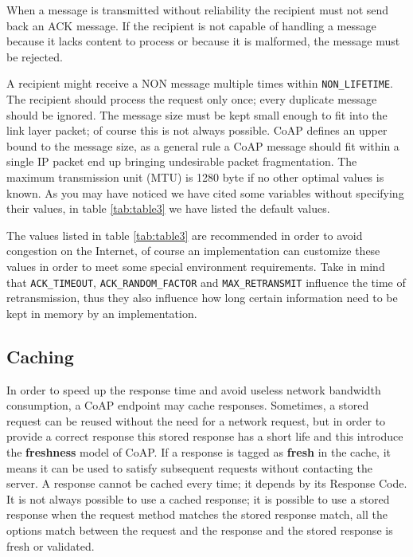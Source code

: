 	When a message is transmitted without reliability the recipient must not send back an ACK message.\newline
	If the recipient is not capable of handling a message because it lacks content to process or because it is malformed, the message must be rejected.\newline
	
	A recipient might receive a NON message multiple times within \texttt{NON\_LIFETIME}.\newline
	The recipient should process the request only once; every duplicate message should be ignored.\newline
	The message size must be kept small enough to fit into the link layer packet; of course this is not always possible.\newline
	CoAP defines an upper bound to the message size, as a general rule a CoAP message should fit within a single IP packet end up bringing undesirable packet fragmentation.\newline
	The maximum transmission unit (MTU) is 1280 byte if no other optimal values is known.\newline
	As you may have noticed we have cited some variables without specifying their values, in table \ref{tab:table3} we have listed the default values.\newline
	
	

	The values listed in table \ref{tab:table3} are recommended in order to avoid congestion on the Internet, of course an implementation can customize these values in order to meet some special environment requirements.\newline
	Take in mind that \texttt{ACK\_TIMEOUT}, \texttt{ACK\_RANDOM\_FACTOR} and \texttt{MAX\_RETRANSMIT} influence the time of retransmission, thus they also influence how long certain information need  to be kept in memory by an implementation.\newline
	
	\subsection{Caching}
	In order to speed up the response time and avoid useless network bandwidth consumption, a CoAP endpoint may cache responses.\newline
	Sometimes, a stored request can be reused without the need for a network request, but in order to provide a correct response this stored response has a short life and this introduce the \textbf{freshness} model of CoAP.\newline
	If a response is tagged as \textbf{fresh} in the cache, it means it can be used to satisfy subsequent requests without contacting the server.\newline
	A response cannot be cached every time; it depends by its Response Code.\newline
	It is not always possible to use a cached response; it is possible to use a stored response when the request method matches the stored response match, all the options match between the request and the response and the stored response is fresh or validated.\newline
	
